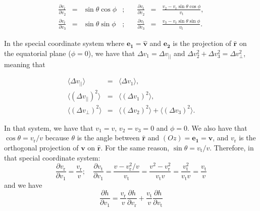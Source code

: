 \documentclass[11pt]{article}
\newcommand{\rt}{\mathrm{t}}
\newcommand{\rr}{\mathrm{r}}
\newcommand{\vr}{v_{\rr}}
\newcommand{\vt}{v_{\rt}}
\newcommand{\e}[1]{\boldsymbol{e_{#1}}}
\newcommand{\bv}{\boldsymbol{v}}
\newcommand{\hv}{\hat{\bv}}
\newcommand{\br}{\boldsymbol{r}}
\newcommand{\hr}{\hat{\br}}
\newcommand{\dvPar}{\Delta v_{||}}
\newcommand{\dvPerp}{\Delta v_{\perp}}
\newcommand{\dvParAvrLoc}{\langle \dvPar \rangle}
\newcommand{\dvParSqAvrLoc}{\langle(\dvPar)^{2}\rangle}
\newcommand{\dvPerpSqAvrLoc}{\langle(\dvPerp)^{2}\rangle}
\begin{document}
\begin{appendices}
\begin{equation}
\begin{array}{cclcccl}
 \displaystyle{\frac{\partial\vr}{\partial v_{2}}}&=& \displaystyle{\sin\theta \cos\phi} &;\quad& \displaystyle{\frac{\partial \vt}{\partial v_{2}}} &=& \displaystyle{\frac{v_{2}-\vr\sin\theta\cos\phi}{\vt}}, \\

 \displaystyle{\frac{\partial\vr}{\partial v_{3}}}&=& \displaystyle{\sin\theta \sin\phi} &;\quad& \displaystyle{\frac{\partial \vt}{\partial v_{3}}} &=& \displaystyle{\frac{v_{3}-\vr\sin\theta\sin\phi}{\vt}} .
 
\end{array}
\label{eq:dvdv1}
\end{equation}

In the special coordinate system where $\e1=\hv$ and $\e2$
is the projection of $\hr$ on the equatorial plane ($\phi=0$),
we have that $\Delta v_{1}=\dvPar$ and $\Delta v_{2}^{2}+\Delta v_{3}^{2}=\dvPerp^{2}$,
meaning that

\begin{equation}
\begin{array}{ccl}
  \dvParAvrLoc&=& \displaystyle{\langle\Delta v_{1}\rangle} ,\\

  \dvParSqAvrLoc&=& \displaystyle{\langle(\Delta v_{1})^{2}\rangle} ,\\

  \dvPerpSqAvrLoc &=& \displaystyle{\langle(\Delta v_{2})^{2}\rangle+\langle(\Delta v_{3})^{2}\rangle} .
\end{array}
\label{eq:SpecialCoordSys_LocDiffCoeffs}
\end{equation}

In that system, we have that $v_{1}=v$, $v_{2}=v_{3}=0$ and $\phi=0$. We
also have that $\cos\theta=\vr/v$ because $\theta$ is the angle
between $\hr$ and $(Oz)=\e1=\hv$, and $\vr$ is
the orthogonal projection of $\bv$ on $\hr$. For
the same reason, $\sin\theta=\vt/v$. Therefore, in that special coordinate
system:
\begin{equation}
\frac{\partial \vr}{\partial v_{1}}=\frac{\vr}{v};\quad\frac{\partial \vt}{\partial v_{1}}=\frac{v-\vr^{2}/v}{\vt}=\frac{v^{2}-\vr^{2}}{\vt v}=\frac{\vt^{2}}{\vt v}=\frac{\vt}{v}
\label{eq:SpecialCoord_dvd1}
\end{equation}
and we have
\begin{equation}
\frac{\partial h}{\partial v_{1}}=\frac{\vr}{v}\frac{\partial h}{\partial \vr}+\frac{\vt}{v}\frac{\partial h}{\partial \vt}
\label{eq:SpecialCoord_dhdv1}
\end{equation}


\end{appendices}
\end{document}
